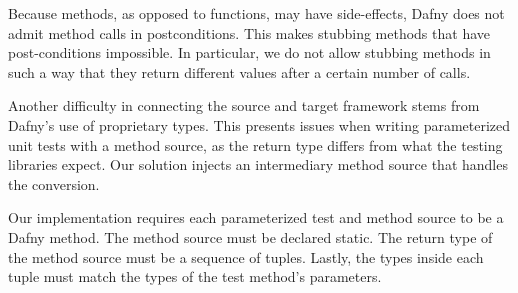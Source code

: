\documentclass[runningheads]{llncs}
\begin{document}
Because methods, as opposed to functions, may have side-effects, Dafny does not admit method calls in postconditions. 
This makes stubbing methods that have post-conditions impossible.
In particular, we do not allow stubbing methods in such a way that they return different values after a certain number of calls. 

Another difficulty in connecting the source and target framework stems from Dafny's use of proprietary types. 
This presents issues when writing parameterized unit tests with a method source, as the return type differs from what the testing libraries expect. 
Our solution injects an intermediary method source that handles the conversion.

Our implementation requires each parameterized test and method source to be a Dafny method. 
The method source must be declared static. 
The return type of the method source must be a sequence of tuples. 
Lastly, the types inside each tuple must match the types of the test method's parameters.
\end{document}
